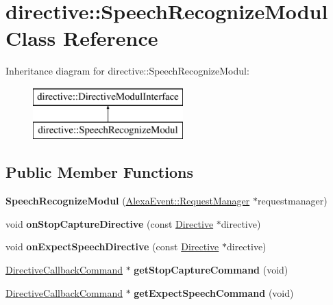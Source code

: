 \hypertarget{classdirective_1_1SpeechRecognizeModul}{}\section{directive\+:\+:Speech\+Recognize\+Modul Class Reference}
\label{classdirective_1_1SpeechRecognizeModul}
Inheritance diagram for directive\+:\+:Speech\+Recognize\+Modul\+:\begin{figure}[H]
\begin{center}
\leavevmode
\includegraphics[height=2.000000cm]{d8/ddc/classdirective_1_1SpeechRecognizeModul}
\end{center}
\end{figure}
\subsection*{Public Member Functions}
\begin{DoxyCompactItemize}
\item 
\mbox{\label{classdirective_1_1SpeechRecognizeModul_a5b7aa3d7cd69ed7ef0400dd28e8f9aa4}} 
{\bfseries Speech\+Recognize\+Modul} (\hyperlink{classAlexaEvent_1_1RequestManager}{Alexa\+Event\+::\+Request\+Manager} $\ast$requestmanager)
\item 
\mbox{\label{classdirective_1_1SpeechRecognizeModul_a2f301027f13d023be1ca71b1ab8ba011}} 
void {\bfseries on\+Stop\+Capture\+Directive} (const \hyperlink{classdirective_1_1Directive}{Directive} $\ast$directive)
\item 
\mbox{\label{classdirective_1_1SpeechRecognizeModul_a654b47908fb4c4b583d2607f11f9a599}} 
void {\bfseries on\+Expect\+Speech\+Directive} (const \hyperlink{classdirective_1_1Directive}{Directive} $\ast$directive)
\item 
\mbox{\label{classdirective_1_1SpeechRecognizeModul_a459558541be128422d742e658c84ae33}} 
\hyperlink{classdirective_1_1DirectiveCallbackCommand}{Directive\+Callback\+Command} $\ast$ {\bfseries get\+Stop\+Capture\+Command} (void)
\item 
\mbox{\label{classdirective_1_1SpeechRecognizeModul_a92b93cb779005dad1bda73696785367c}} 
\hyperlink{classdirective_1_1DirectiveCallbackCommand}{Directive\+Callback\+Command} $\ast$ {\bfseries get\+Expect\+Speech\+Command} (void)
\end{DoxyCompactItemize}
